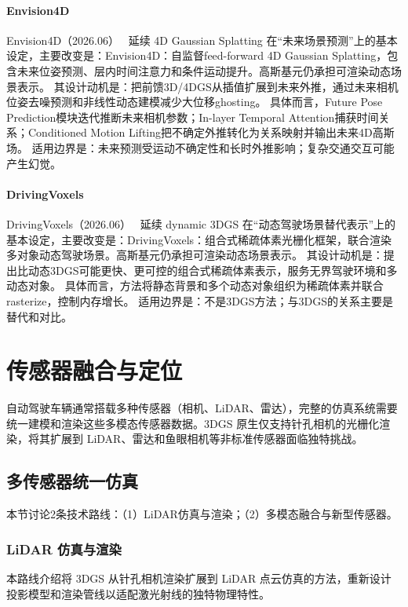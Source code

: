 \paragraph{Envision4D}
Envision4D（2026.06）~\cite{2606_10656} 延续 4D Gaussian Splatting 在“未来场景预测”上的基本设定，主要改变是：Envision4D：自监督feed-forward 4D Gaussian Splatting，包含未来位姿预测、层内时间注意力和条件运动提升。高斯基元仍承担可渲染动态场景表示。
其设计动机是：把前馈3D/4DGS从插值扩展到未来外推，通过未来相机位姿去噪预测和非线性动态建模减少大位移ghosting。
具体而言，Future Pose Prediction模块迭代推断未来相机参数；In-layer Temporal Attention捕获时间关系；Conditioned Motion Lifting把不确定外推转化为关系映射并输出未来4D高斯场。
适用边界是：未来预测受运动不确定性和长时外推影响；复杂交通交互可能产生幻觉。

\paragraph{DrivingVoxels}
DrivingVoxels（2026.06）~\cite{2606_23031} 延续 dynamic 3DGS 在“动态驾驶场景替代表示”上的基本设定，主要改变是：DrivingVoxels：组合式稀疏体素光栅化框架，联合渲染多对象动态驾驶场景。高斯基元仍承担可渲染动态场景表示。
其设计动机是：提出比动态3DGS可能更快、更可控的组合式稀疏体素表示，服务无界驾驶环境和多动态对象。
具体而言，方法将静态背景和多个动态对象组织为稀疏体素并联合rasterize，控制内存增长。
适用边界是：不是3DGS方法；与3DGS的关系主要是替代和对比。
\section{传感器融合与定位}
\label{sec:18_4}

自动驾驶车辆通常搭载多种传感器（相机、LiDAR、雷达），完整的仿真系统需要统一建模和渲染这些多模态传感器数据。3DGS 原生仅支持针孔相机的光栅化渲染，将其扩展到 LiDAR、雷达和鱼眼相机等非标准传感器面临独特挑战。

\subsection{多传感器统一仿真}
\label{ss:18_6}

本节讨论2条技术路线：（1）LiDAR仿真与渲染；（2）多模态融合与新型传感器。

\subsubsection{LiDAR 仿真与渲染}

本路线介绍将 3DGS 从针孔相机渲染扩展到 LiDAR 点云仿真的方法，重新设计投影模型和渲染管线以适配激光射线的独特物理特性。

